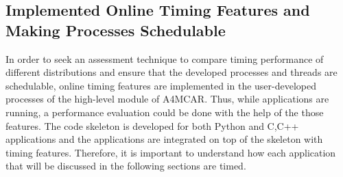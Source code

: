 \subsection{Implemented Online Timing Features and Making Processes Schedulable} \label{onlinetiming}
In order to seek an assessment technique to compare timing performance of different distributions and ensure that the developed processes and threads are schedulable, online timing features are implemented in the user-developed processes of the high-level module of A4MCAR. Thus, while applications are running, a performance evaluation could be done with the help of the those features. The code skeleton is developed for both Python and C,C++ applications and the applications are integrated on top of the skeleton with timing features. Therefore, it is important to understand how each application that will be discussed in the following sections are timed.


